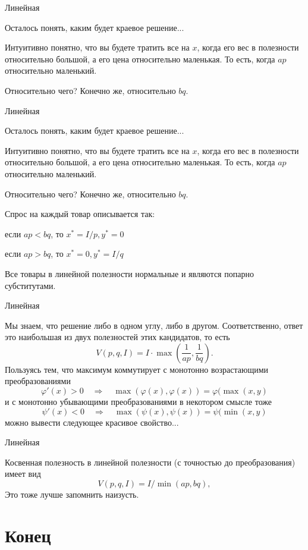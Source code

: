 \documentclass{beamer}
\begin{document}
\begin{frame}{Линейная}

Осталось понять, каким будет краевое решение...

Интуитивно понятно, что вы будете тратить все на $x$, когда его вес в полезности относительно большой, а его цена относительно маленькая. То есть, когда $ap$ относительно маленький. 

Относительно чего? Конечно же, относительно $bq$.

\end{frame}

\begin{frame}{Линейная}

Осталось понять, каким будет краевое решение...

Интуитивно понятно, что вы будете тратить все на $x$, когда его вес в полезности относительно большой, а его цена относительно маленькая. То есть, когда $ap$ относительно маленький. 

Относительно чего? Конечно же, относительно $bq$.

Спрос на каждый товар описывается так: 

если $ap < bq$, то $x^{\ast} = I/p, y^{\ast} = 0$

если $ap > bq$, то $x^{\ast} = 0, y^{\ast} = I/q$

Все товары в линейной полезности нормальные и являются попарно субститутами.

\end{frame}

\begin{frame}{Линейная}

Мы знаем, что решение либо в одном углу, либо в другом. Соответственно, ответ это наибольшая из двух полезностей этих кандидатов, то есть
$$V(p,q,I) = I \cdot \max(\frac{1}{ap}, \frac{1}{bq}).$$
Пользуясь тем, что максимум коммутирует с монотонно возрастающими преобразованиями
$$ \varphi'(x) >0 \quad \Rightarrow \quad \max(\varphi(x), \varphi(x)) = \varphi(\max(x, y)$$
и с монотонно убывающими преобразованиями в некотором смысле тоже
$$ \psi'(x) < 0 \quad \Rightarrow \quad \max(\psi(x), \psi(x)) = \psi(\min(x, y)$$
можно вывести следующее красивое свойство...

\end{frame}

\begin{frame}{Линейная}

Косвенная полезность в линейной полезности (с точностью до преобразования) имеет вид
$$V(p,q,I) = I / \min(ap, bq),$$
Это тоже лучше запомнить наизусть.
\end{frame}



\section{Конец}
\end{document}
